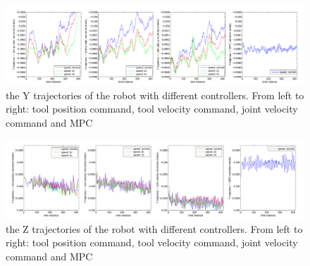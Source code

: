 \begin{figure}
\centering
\includegraphics[width=1.1\linewidth]{trajectory_data_Y.pdf}
\caption{the Y trajectories of the robot with different controllers. From left to right: tool position command, tool velocity command, joint velocity command and \ac{MPC}}
\label{fig:trajectory_data_Y}
\end{figure}
\begin{figure}
\centering
\includegraphics[width=1.1\linewidth]{trajectory_data_Z.pdf}
\caption{the Z trajectories of the robot with different controllers. From left to right: tool position command, tool velocity command, joint velocity command and \ac{MPC}}
\label{fig:trajectory_data_Z}
\end{figure}

 

